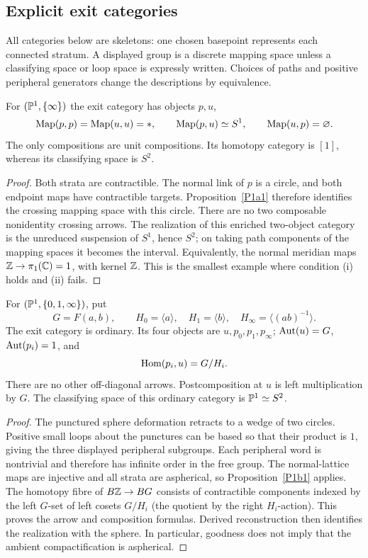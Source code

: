 \subsection{Explicit exit categories}
\label{sec:explicit-examples}

All categories below are skeletons: one chosen basepoint represents each
connected stratum. A displayed group is a discrete mapping space unless a
classifying space or loop space is expressly written. Choices of paths and
positive peripheral generators change the descriptions by equivalence.

\begin{proposition}\label{P1e1}
For $(\mathbb P^1,\{\infty\})$ the exit category has objects $p,u$,
\[
 \operatorname{Map}(p,p)=\operatorname{Map}(u,u)=*,\qquad \operatorname{Map}(p,u)\simeq S^1,
 \qquad \operatorname{Map}(u,p)=\varnothing.
\]
The only compositions are unit compositions. Its homotopy category is
$[1]$, whereas its classifying space is $S^2$.
\end{proposition}
\begin{proof}
Both strata are contractible. The normal link of $p$ is a circle, and both
endpoint maps have contractible targets. Proposition~\ref{P1a1} therefore
identifies the crossing mapping space with this circle. There are no two
composable nonidentity crossing arrows. The realization of this enriched
two-object category is the unreduced suspension of $S^1$, hence $S^2$;
on taking path components of the mapping spaces it becomes the interval.
Equivalently, the normal meridian maps $\mathbb Z\to\pi_1(\mathbb C)=1$, with kernel
$\mathbb Z$. This is the smallest example where condition (i) holds and (ii)
fails.
\end{proof}

\begin{proposition}\label{P1e2}
For $(\mathbb P^1,\{0,1,\infty\})$, put
\[
 G=F(a,b),\qquad H_0=\langle a\rangle,\quad
 H_1=\langle b\rangle,\quad H_\infty=\langle(ab)^{-1}\rangle.
\]
The exit category is ordinary. Its four objects are $u,p_0,p_1,p_\infty$;
$\operatorname{Aut}(u)=G$, $\operatorname{Aut}(p_i)=1$, and
\[
 \operatorname{Hom}(p_i,u)=G/H_i.
\]
There are no other off-diagonal arrows. Postcomposition at $u$ is left
multiplication by $G$. The classifying space of this ordinary category is
$\mathbb P^1\simeq S^2$.
\end{proposition}
\begin{proof}
The punctured sphere deformation retracts to a wedge of two circles.
Positive small loops about the punctures can be based so that their
product is $1$, giving the three displayed peripheral subgroups. Each
peripheral word is nontrivial and therefore has infinite order in the
free group. The normal-lattice maps are injective and all strata are
aspherical, so Proposition~\ref{P1b1} applies. The homotopy fibre of
$B\mathbb Z\to BG$ consists of contractible components indexed by the left
$G$-set of left cosets $G/H_i$ (the quotient by the right $H_i$-action).
This proves the arrow and composition
formulas. Derived reconstruction then identifies the realization with
the sphere. In particular, goodness does not imply that the ambient
compactification is aspherical.
\end{proof}

